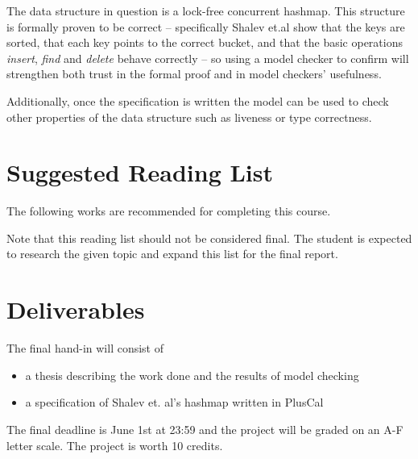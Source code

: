 \documentclass[journal]{IEEEtran}
\begin{document}
The data structure in question is a lock-free concurrent hashmap\cite{Shalev2006}. This structure is formally proven to be correct -- specifically Shalev et.al show that the keys are sorted, that each key points to the correct bucket, and that the basic operations \textit{insert}, \textit{find} and \textit{delete} behave correctly -- so using a model checker to confirm will strengthen both trust in the formal proof and in model checkers' usefulness.

Additionally, once the specification is written the model can be used to check other properties of the data structure such as liveness or type correctness.


\section{Suggested Reading List}
The following works are recommended for completing this course.
\newrefsegment
\nocite{Clarke2009}
\nocite{Lund2019}
\nocite{Shalev2006}
\nocite{Lamport_specifying_2002}
\nocite{Amazon2015}
\nocite{Lamport_video_2019}
\printbibliography[heading=none,segment=1]

\noindent
Note that this reading list should not be considered final. The student is
expected to research the given topic and expand this
list for the final report.

\section{Deliverables}
The final hand-in will consist of
\begin{itemize}
\item a thesis describing the work done and the results of model checking
\item a specification of Shalev et. al's hashmap written in PlusCal
\end{itemize}
\noindent
The final deadline is June 1st at 23:59 and the project will be graded on an A-F letter scale. The project is worth 10 credits.
\end{document}
